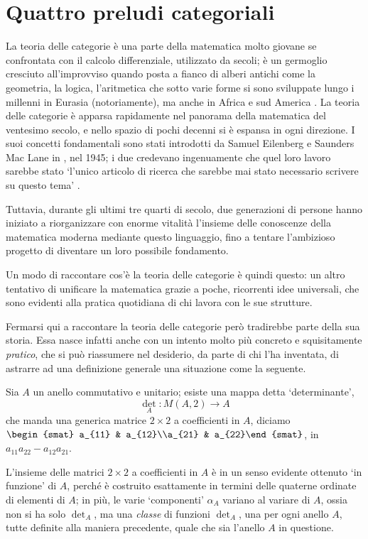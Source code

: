 \chapter{Quattro preludi categoriali}\label{cap_preludi}
La teoria delle categorie è una parte della matematica molto giovane se confrontata con il calcolo differenziale, utilizzato da secoli; è un germoglio cresciuto all'improvviso quando posta a fianco di alberi antichi come la geometria, la logica, l'aritmetica che sotto varie forme si sono sviluppate lungo i millenni in Eurasia (notoriamente), ma anche in Africa \cite{ref_appropriata} e sud America \cite{ref_appropriata}. La teoria delle categorie è apparsa rapidamente nel panorama della matematica del ventesimo secolo, e nello spazio di pochi decenni si è espansa in ogni direzione. I suoi concetti fondamentali sono stati introdotti da Samuel Eilenberg e Saunders Mac Lane in \cite{gtone}, nel 1945; i due credevano ingenuamente che quel loro lavoro sarebbe stato `l'unico articolo di ricerca che sarebbe mai stato necessario scrivere su questo tema' \cite{maclane1988concepts}.

Tuttavia, durante gli ultimi tre quarti di secolo, due generazioni di persone %
hanno iniziato a riorganizzare con enorme vitalità l'insieme delle conoscenze della matematica moderna mediante questo linguaggio, fino a tentare l'ambizioso progetto di diventare un loro possibile fondamento.

Un modo di raccontare cos'è la teoria delle categorie è quindi questo: un altro tentativo di unificare la matematica grazie a poche, ricorrenti idee universali, che sono evidenti alla pratica quotidiana di chi lavora con le sue strutture.
\medskip

Fermarsi qui a raccontare la teoria delle categorie però tradirebbe parte della sua storia. Essa nasce infatti anche con un intento molto più concreto e squisitamente \emph{pratico}, che si può riassumere nel desiderio, da parte di chi l'ha inventata, di astrarre ad una definizione generale una situazione come la seguente.
\begin{example}
	Sia \(A\) un anello commutativo e unitario; esiste una mappa detta `determinante',
	\[\textstyle\det_A : M(A,2) \to A\]
	che manda una generica matrice \(2\times 2\) a coefficienti in \(A\), diciamo \(\begin{smat} a_{11} & a_{12}\\a_{21} & a_{22}\end{smat}\), in \(a_{11}a_{22}-a_{12}a_{21}\).
\end{example}
L'insieme delle matrici \(2\times 2\) a coefficienti in \(A\) è in un senso evidente ottenuto `in funzione' di \(A\), perché è costruito esattamente in termini delle quaterne ordinate di elementi di \(A\); in più, le varie `componenti' \(\alpha_A\) variano al variare di \(A\), ossia non si ha solo \(\det_A\), ma una \emph{classe} di funzioni \(\det_A\), una per ogni anello \(A\), tutte definite alla maniera precedente, quale che sia l'anello \(A\) in questione.

